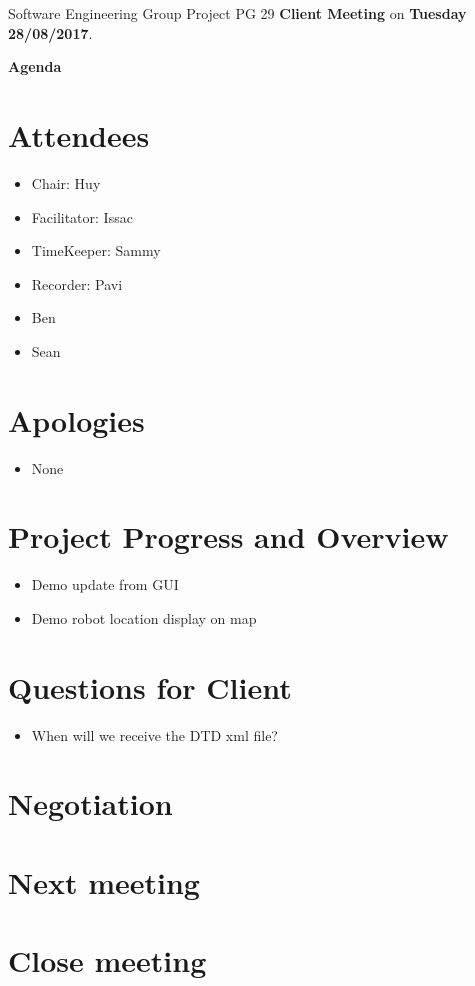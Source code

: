 \documentclass[11pt, a4paper]{article}
\begin{document}
\noindent Software Engineering Group Project PG 29 {\bf Client Meeting} on {\bf Tuesday 28/08/2017}.
\vspace*{10pt}
\begin{center}
\huge \bf Agenda
\end{center}

\section{Attendees}
\begin{itemize}
\item Chair: Huy
\item Facilitator: Issac 
\item TimeKeeper: Sammy 
\item Recorder: Pavi
\item Ben
\item Sean
\end{itemize}

\section{Apologies}
\begin{itemize}
\item None
\end{itemize}

\section{Project Progress and Overview}
\begin{itemize}
	\item Demo update from GUI 
	\item Demo robot location display on map
\end{itemize}


\section{Questions for Client}
\begin{itemize}
	\item When will we receive the DTD xml file?
\end{itemize}
\section{Negotiation}


\section{Next meeting}

\section {Close meeting}
\vspace*{10pt}
\end{document}
